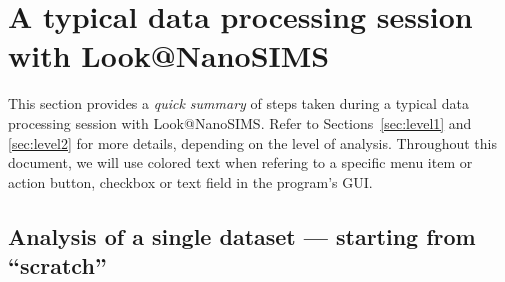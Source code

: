 \documentclass[a4paper, 11pt]{article}
\newcommand{\ttt}[1]{\texttt{#1}}
\newcommand{\lans}[1]{{\color{magenta}#1}}
\newcommand{\lanscb}[1]{{\color{darkgreen}#1}}
\newcommand{\lanstf}[1]{{\color{cyan}#1}}
\newcounter{step}
\begin{document}

\clearpage

\section{A typical data processing session with Look@NanoSIMS}

This section provides a \emph{quick summary} of steps taken during a typical data processing session with Look@NanoSIMS. Refer to Sections~\ref{sec:level1} and \ref{sec:level2} for more details, depending on the level of analysis. Throughout this document, we will use colored text when refering to a specific \lans{menu item or action button}, \lanscb{checkbox} or \lanstf{text field} in the program's GUI.


\subsection{Analysis of a single dataset --- starting from ``scratch''}
\label{sec:analysis_from_scratch}
\end{document}
